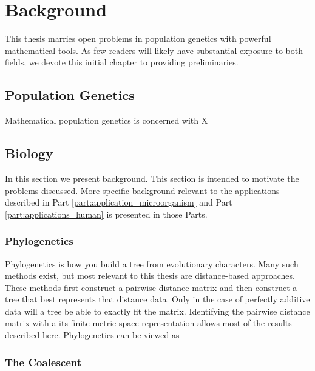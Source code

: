 
\chapter{Background}
\label{ch:background}

This thesis marries open problems in population genetics with powerful mathematical tools.
As few readers will likely have substantial exposure to both fields, we devote this initial chapter to providing preliminaries.

\section{Population Genetics}

Mathematical population genetics is concerned with X

\section{Biology}

In this section we present background.
This section is intended to motivate the problems discussed.
More specific background relevant to the applications described in Part \ref{part:application_microorganism} and Part \ref{part:applications_human} is presented in those Parts.

\subsection{Phylogenetics}

Phylogenetics is how you build a tree from evolutionary characters.
Many such methods exist, but most relevant to this thesis are distance-based approaches.
These methods first construct a pairwise distance matrix and then construct a tree that best represents that distance data.
Only in the case of perfectly additive data will a tree be able to exactly fit the matrix.
Identifying the pairwise distance matrix with a its finite metric space representation allows most of the results described here.
Phylogenetics can be viewed as 

\subsection{The Coalescent}

